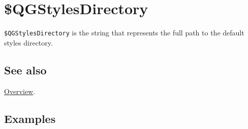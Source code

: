 \documentclass[../FeynHelpersManual.tex]{subfiles}
\begin{document}
\hypertarget{dollarqgstylesdirectory}{
\section{\$QGStylesDirectory}\label{dollarqgstylesdirectory}}

\texttt{\$QGStylesDirectory} is the string that represents the full path
to the default styles directory.

\subsection{See also}

\hyperlink{toc}{Overview}.

\subsection{Examples}
\end{document}
